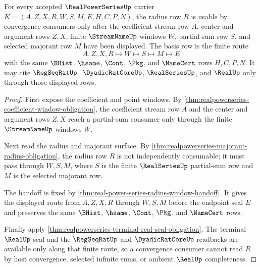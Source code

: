 \begin{theorem}
\label{thm:realpowerseries-radius-window-obligation-basis}
For every accepted $\RealPowerSeriesUp$ carrier $K=(A,Z,X,R,W,S,M,E,H,C,P,N)$, the radius row $R$ is usable by convergence consumers only after the coefficient stream row $A$, center and argument rows $Z,X$, finite $\StreamNameUp$ windows $W$, partial-sum row $S$, and selected majorant row $M$ have been displayed. The basis row is the finite route
$$
A,Z,X,R\longmapsto W\longmapsto S\longmapsto M\longmapsto E
$$
with the same $\BHist$, $\hsame$, $\Cont$, $\Pkg$, and $\NameCert$ rows $H,C,P,N$. It may cite $\RegSeqRatUp$, $\DyadicRatCoreUp$, $\RealSeriesUp$, and $\RealUp$ only through those displayed rows.
\end{theorem}
\begin{proof}
First expose the coefficient and point windows. By \autoref{thm:realpowerseries-coefficient-window-obligation}, the coefficient stream row $A$ and the center and argument rows $Z,X$ reach a partial-sum consumer only through the finite $\StreamNameUp$ windows $W$.

Next read the radius and majorant surface. By \autoref{thm:realpowerseries-majorant-radius-obligation}, the radius row $R$ is not independently consumable; it must pass through $W,S,M$, where $S$ is the finite $\RealSeriesUp$ partial-sum row and $M$ is the selected majorant row.

The handoff is fixed by \autoref{thm:real-power-series-radius-window-handoff}. It gives the displayed route from $A,Z,X,R$ through $W,S,M$ before the endpoint seal $E$ and preserves the same $\BHist$, $\hsame$, $\Cont$, $\Pkg$, and $\NameCert$ rows.

Finally apply \autoref{thm:realpowerseries-terminal-real-seal-obligation}. The terminal $\RealUp$ seal and the $\RegSeqRatUp$ and $\DyadicRatCoreUp$ readbacks are available only along that finite route, so a convergence consumer cannot read $R$ by host convergence, selected infinite sums, or ambient $\RealUp$ completeness.
\end{proof}

